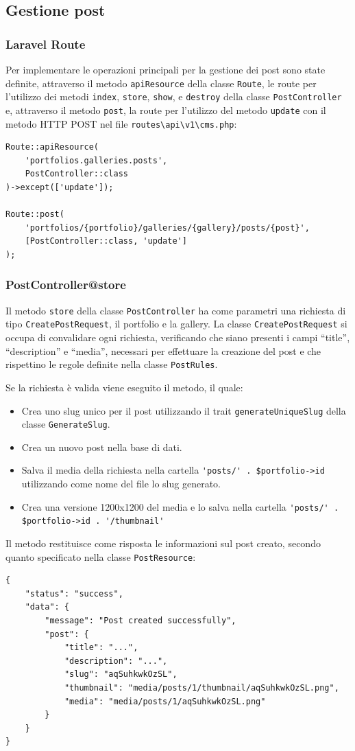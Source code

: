 \subsection{Gestione post}
\subsubsection{Laravel Route}
Per implementare le operazioni principali per la gestione dei post sono state definite, attraverso il metodo \verb|apiResource| della classe \verb|Route|, le route per l'utilizzo dei metodi \verb|index|, \verb|store|, \verb|show|, e \verb|destroy| della classe \verb|PostController| e, attraverso il metodo \verb|post|, la route per l'utilizzo del metodo \verb|update| con il metodo HTTP POST nel file \verb|routes\api\v1\cms.php|:
\begin{lstlisting}[caption={Route operazioni principali per la gestione dei post}, label={lst:route-cms-p}]
Route::apiResource(
	'portfolios.galleries.posts',
	PostController::class
)->except(['update']);

Route::post(
	'portfolios/{portfolio}/galleries/{gallery}/posts/{post}',
	[PostController::class, 'update']
);
\end{lstlisting}

\subsubsection{PostController@store}
Il metodo \verb|store| della classe \verb|PostController| ha come parametri una richiesta di tipo \verb|CreatePostRequest|, il portfolio e la gallery. La classe \verb|CreatePostRequest| si occupa di convalidare ogni richiesta, verificando che siano presenti i campi ``title'', ``description'' e ``media'', necessari per effettuare la creazione del post e che rispettino le regole definite nella classe \verb|PostRules|. 

Se la richiesta \`e valida viene eseguito il metodo, il quale:
\begin{itemize}
	\item Crea uno slug unico per il post utilizzando il trait \verb|generateUniqueSlug| della classe \verb|GenerateSlug|.
	\item Crea un nuovo post nella base di dati.
	\item Salva il media della richiesta nella cartella \verb|'posts/' . $portfolio->id| utilizzando come nome del file lo slug generato.
	\item Crea una versione 1200x1200 del media e lo salva nella cartella \verb|'posts/' . $portfolio->id . '/thumbnail'|
\end{itemize} 
Il metodo restituisce come risposta le informazioni sul post creato, secondo quanto specificato nella classe \verb|PostResource|:
\begin{lstlisting}[caption={Risposta di successo creazione post}, label={lst:response_success_registration}]
{
	"status": "success",
	"data": {
		"message": "Post created successfully",
		"post": {
			"title": "...",
			"description": "...",
			"slug": "aqSuhkwkOzSL",
			"thumbnail": "media/posts/1/thumbnail/aqSuhkwkOzSL.png",
			"media": "media/posts/1/aqSuhkwkOzSL.png"
		}
	}
}
\end{lstlisting}

